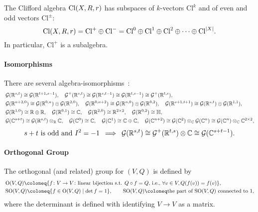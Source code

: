 \documentclass[CheatSheet]{subfiles}
\begin{document}
The Clifford algebra $\Cl(X,R,r)$ has subspaces of $k$-vectors $\mathrm{Cl}^k$ and of even and odd vectors $\mathrm{Cl}^\pm$:
\[
\Cl(X,R,r)=\mathrm{Cl}^+\oplus\mathrm{Cl}^-=
\mathrm{Cl}^0\oplus\mathrm{Cl}^1\oplus\mathrm{Cl}^2\oplus\cdots\oplus\mathrm{Cl}^{|X|}.
\]
In particular, $\mathrm{Cl}^+$ is a subalgebra.

\paragraph{Isomorphisms}
There are several algebra-isomorphisms~\cite{Lundholm:2009xd}:
\begin{align*}
&\GeoA(\RR^{s,t})\cong \GeoA(\RR^{t+1,s-1}),\quad
\GeoA^+(\RR^{s,t})\cong \GeoA(\RR^{s,t-1})\cong \GeoA(\RR^{t,s-1})\cong\GeoA^+(\RR^{t,s}),\\
&\GeoA(\RR^{n+2,0})\cong\GeoA(\RR^{0,n})\otimes\GeoA(\RR^{2,0}),\quad
\GeoA(\RR^{0,n+2})\cong\GeoA(\RR^{n,0})\otimes\GeoA(\RR^{0,2}),\quad
\GeoA(\RR^{s+1,t+1})\cong\GeoA(\RR^{s,t})\otimes\GeoA(\RR^{1,1}),\\
&\GeoA(\RR^{1,0})\cong\RR\oplus\RR,\quad
\GeoA(\RR^{0,1})\cong\CC,\quad
\GeoA(\RR^{2,0})\cong\RR^{2\times2},\quad
\GeoA(\RR^{0,2})\cong\mathbb{H},\\
&\GeoA(\CC^{s+t})\cong\GeoA(\RR^{s,t})\otimes_\RR\CC,\quad
\GeoA(\CC^{0})\cong\CC,\quad
\GeoA(\CC^{1})\cong\CC\oplus\CC,\quad
\GeoA(\CC^{n+2})\cong\GeoA(\CC^2)\otimes_\CC\GeoA(\CC^n)\cong\GeoA(\CC^n)\otimes_\CC \CC^{2\times2},
\end{align*}
\[
  \text{$s+t$ is odd and $I^2=-1$}\then \GeoA(\RR^{s,t})\cong\GeoA^+(\RR^{t,s})\otimes \CC\cong\GeoA(\CC^{s+t-1}).
\]

\paragraph{Orthogonal Group}
The orthogonal (and related) group for $(V,Q)$ is defined by
\begin{align*}
&\gO(V,Q)\deq \{f\colon V\to V\colon\text{linear bijection s.t. $Q\circ f=Q$, i.e., $\forall v\in V, Q(f(v))=f(v)$}\},\\
&\gSO(V,Q)\deq \{f\in\gO(V,Q)\mid \det f=1\},\qquad\gSO(V,Q)\deq\text{the part of $\gSO(V,Q)$ connected to 1},
\end{align*}
where the determinant is defined with identifying $V\to V$ as a matrix.
\end{document}

